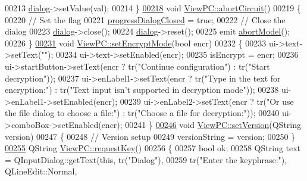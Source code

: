 \begin{DoxyCode}
00213         \hyperlink{class_view_p_c_a31abbb470fe329b44e6ffee202b903ca}{dialog}->setValue(val);
00214 \}
\hypertarget{viewpc_8cpp_source.tex_l00218}{}\hyperlink{class_view_p_c_ad7ba2fcf1d17862de15e32432823f7b0}{00218} \textcolor{keywordtype}{void} \hyperlink{class_view_p_c_ad7ba2fcf1d17862de15e32432823f7b0}{ViewPC::abortCircuit}()
00219 \{
00220     \textcolor{comment}{// Set the flag}
00221     \hyperlink{class_view_p_c_add8c82aa2b0b934212aa5bde9277ab36}{progressDialogClosed} = \textcolor{keyword}{true};
00222     \textcolor{comment}{// Close the dialog}
00223     \hyperlink{class_view_p_c_a31abbb470fe329b44e6ffee202b903ca}{dialog}->close();
00224     \hyperlink{class_view_p_c_a31abbb470fe329b44e6ffee202b903ca}{dialog}->reset();
00225     emit \hyperlink{class_view_p_c_aa652102ce6b5757b8eef830409c8cabf}{abortModel}();
00226 \}
\hypertarget{viewpc_8cpp_source.tex_l00231}{}\hyperlink{class_view_p_c_a5b48951efefdc0e3039c9a4bf185320b}{00231} \textcolor{keywordtype}{void} \hyperlink{class_view_p_c_a5b48951efefdc0e3039c9a4bf185320b}{ViewPC::setEncryptMode}(\textcolor{keywordtype}{bool} encr)
00232 \{
00233     ui->text->setText(\textcolor{stringliteral}{""});
00234     ui->text->setEnabled(encr);
00235     isEncrypt = encr;
00236     ui->startButton->setText(encr ? tr(\textcolor{stringliteral}{"Continue configuration"}) : tr(\textcolor{stringliteral}{"Start decryption"}));
00237     ui->enLabel1->setText(encr ? tr(\textcolor{stringliteral}{"Type in the text for encryption:"}) : tr(\textcolor{stringliteral}{"Text input isn't supported in
       decryption mode"}));
00238     ui->enLabel1->setEnabled(encr);
00239     ui->enLabel2->setText(encr ? tr(\textcolor{stringliteral}{"Or use the file dialog to choose a file:"}) : tr(\textcolor{stringliteral}{"Choose a file for
       decryption:"}));
00240     ui->comboBox->setEnabled(encr);
00241 \}
\hypertarget{viewpc_8cpp_source.tex_l00246}{}\hyperlink{class_view_p_c_ac05220df875b7c4f24405a5742476ebf}{00246} \textcolor{keywordtype}{void} \hyperlink{class_view_p_c_ac05220df875b7c4f24405a5742476ebf}{ViewPC::setVersion}(QString version)
00247 \{
00248     \textcolor{comment}{// Version setup}
00249     versionString = version;
00250 \}
\hypertarget{viewpc_8cpp_source.tex_l00255}{}\hyperlink{class_view_p_c_a559c95675ec98b15451f3bca47033d9c}{00255} QString \hyperlink{class_view_p_c_a559c95675ec98b15451f3bca47033d9c}{ViewPC::requestKey}()
00256 \{
00257     \textcolor{keywordtype}{bool} ok;
00258     QString text = QInputDialog::getText(\textcolor{keyword}{this}, tr(\textcolor{stringliteral}{"Dialog"}),
00259                                          tr(\textcolor{stringliteral}{"Enter the keyphrase:"}), QLineEdit::Normal,

\end{DoxyCode}

